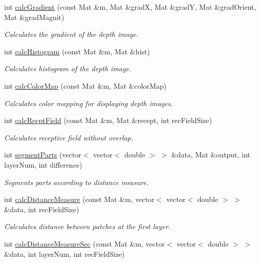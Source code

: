 \begin{DoxyCompactItemize}
int \hyperlink{class_first_layer_aba8577b4d6cb790edc7bd04446727f28}{calc\-Gradient} (const Mat \&m, Mat \&grad\-X, Mat \&grad\-Y, Mat \&grad\-Orient, Mat \&grad\-Magnit)
\begin{DoxyCompactList}\small\item\em Calculates the gradient of the depth image. \end{DoxyCompactList}\item 
int \hyperlink{class_first_layer_a2a88c95e693b614a27be5bb5c536d41c}{calc\-Histogram} (const Mat \&m, Mat \&hist)
\begin{DoxyCompactList}\small\item\em Calculates histogram of the depth image. \end{DoxyCompactList}\item 
int \hyperlink{class_first_layer_a485d0275f548130fad99051cb8736dc5}{calc\-Color\-Map} (const Mat \&m, Mat \&color\-Map)
\begin{DoxyCompactList}\small\item\em Calculates color mapping for displaying depth images. \end{DoxyCompactList}\item 
int \hyperlink{class_first_layer_a62260984a4e3d9c473234e4b48610974}{calc\-Recpt\-Field} (const Mat \&m, Mat \&recept, int rec\-Field\-Size)
\begin{DoxyCompactList}\small\item\em Calculates receptive field without overlap. \end{DoxyCompactList}\item 
int \hyperlink{class_first_layer_a6cf9ba54ebcb3d63a6fe84d5dc4d50dc}{segment\-Parts} (vector$<$ vector$<$ double $>$ $>$ \&data, Mat \&output, int layer\-Num, int difference)
\begin{DoxyCompactList}\small\item\em Segments parts according to distance measure. \end{DoxyCompactList}\item 
int \hyperlink{class_first_layer_ac0013ac908aa60b6fbb791998f845a5c}{calc\-Distance\-Measure} (const Mat \&m, vector$<$ vector$<$ double $>$ $>$ \&data, int rec\-Field\-Size)
\begin{DoxyCompactList}\small\item\em Calculates distance between patches at the first layer. \end{DoxyCompactList}\item 
int \hyperlink{class_first_layer_a1c6b8fed0cde49a767acbc38dfa521f7}{calc\-Distance\-Measure\-Sec} (const Mat \&m, vector$<$ vector$<$ double $>$ $>$ \&data, int layer\-Num, int rec\-Field\-Size)

\end{DoxyCompactItemize}
